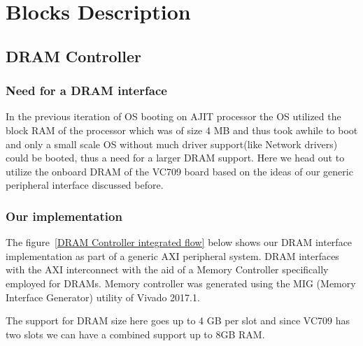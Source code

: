 \chapter{Blocks Description}




\section{DRAM Controller}

\subsection{Need for a DRAM interface}

In the previous iteration of OS booting on AJIT processor the OS utilized the block RAM of the processor which was of size 4 MB
and thus took awhile to boot and only a small scale OS without much driver support(like Network drivers) could be booted, thus a need for a
larger DRAM support.  Here we head out to utilize the onboard DRAM of the VC709 board based on the ideas of our generic peripheral
interface discussed before.

\subsection{Our implementation}

The figure~\ref{DRAM Controller integrated flow} below shows our DRAM interface implementation as part of a generic AXI peripheral system.
DRAM interfaces with the AXI interconnect with the aid of a Memory Controller specifically employed for DRAMs. Memory controller was
generated using the MIG (Memory Interface Generator) utility of Vivado 2017.1. 

The support for DRAM size here goes up to 4 GB per slot and since VC709 has two slots we can have a combined support up to 8GB RAM.

